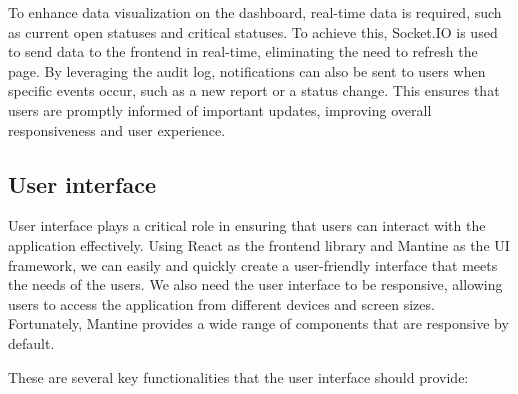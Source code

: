 To enhance data visualization on the dashboard, real-time data is required, such as current open statuses and critical statuses. To achieve this, Socket.IO is used to send data to the frontend in real-time, eliminating the need to refresh the page. By leveraging the audit log, notifications can also be sent to users when specific events occur, such as a new report or a status change. This ensures that users are promptly informed of important updates, improving overall responsiveness and user experience.

\subsection{User interface}
\label{subsec:internship_experience:user_interface}

User interface plays a critical role in ensuring that users can interact with the application effectively. Using React as the frontend library and Mantine as the UI framework, we can easily and quickly create a user-friendly interface that meets the needs of the users. We also need the user interface to be responsive, allowing users to access the application from different devices and screen sizes. Fortunately, Mantine provides a wide range of components that are responsive by default.

These are several key functionalities that the user interface should provide:

